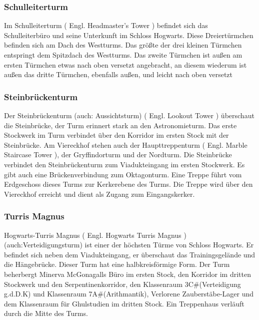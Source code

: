 \documentclass[a4paper, 10pt]{article}
\begin{document}
\subsubsection*{\large Schulleiterturm}
Im Schulleiterturm (  Engl.  Headmaster's Tower ) befindet sich das Schulleiterbüro und seine Unterkunft im Schloss Hogwarts. Diese Dreiertürmchen befinden sich am Dach des Westturms.
\vspace{10pt}
\newline
Das größte der drei kleinen Türmchen entspringt dem Spitzdach des Westturms. Das zweite Türmchen ist außen am ersten Türmchen etwas nach oben versetzt angebracht, an diesem wiederum ist außen das dritte Türmchen, ebenfalls außen, und leicht nach oben versetzt
\subsubsection*{\large Steinbrückenturm}
Der Steinbrückenturm (auch: Aussichtsturm) (  Engl.  Lookout Tower ) überschaut die Steinbrücke, der Turm erinnert stark an den Astronomieturm. Das erste Stockwerk im Turm verbindet über den Korridor im ersten Stock mit der Steinbrücke.
\vspace{10pt}
\newline
Am Viereckhof stehen auch der Haupttreppenturm (  Engl.  Marble Staircase Tower ), der Gryffindorturm und der Nordturm. Die Steinbrücke verbindet den Steinbrückenturm zum Viadukteingang im ersten Stockwerk. Es gibt auch eine Brückenverbindung zum Oktagonturm.
\vspace{10pt}
\newline
Eine Treppe führt vom Erdgeschoss dieses Turms zur Kerkerebene des Turms. Die Treppe wird über den Viereckhof erreicht und dient als Zugang zum Eingangskerker.
\subsubsection*{\large Turris Magnus}
Hogwarts-Turris Magnus (  Engl.  Hogwarts Turris Magnus ) (auch:Verteidigungsturm) ist einer der höchsten Türme von Schloss Hogwarts. Er befindet sich neben dem Viadukteingang, er überschaut das Trainingsgelände und die Hängebrücke. Dieser Turm hat eine halbkreisförmige Form.
\vspace{10pt}
\newline
Der Turm beherbergt Minerva McGonagalls Büro im ersten Stock, den Korridor im dritten Stockwerk und den Serpentinenkorridor, den Klassenraum 3C#(Verteidigung g.d.D.K) und Klassenraum 7A#(Arithmantik), Verlorene Zauberstäbe-Lager und dem Klassenraum für Ghulstudien im dritten Stock. Ein Treppenhaus verläuft durch die Mitte des Turms.
\end{document}
